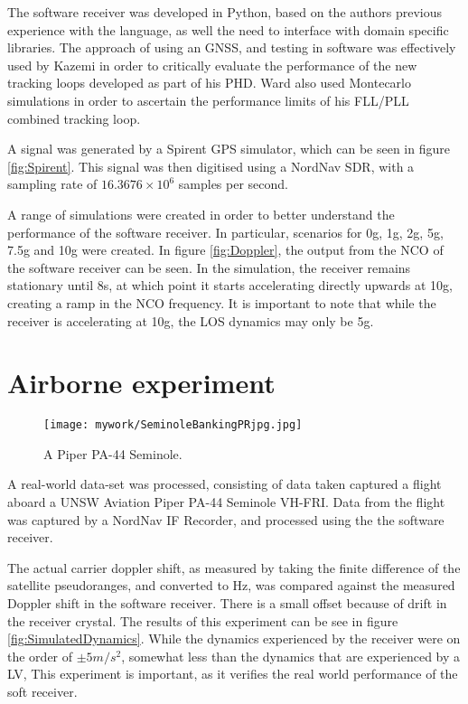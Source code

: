 The software receiver was developed in Python, based on the authors previous experience with the language, as well the need to interface with domain specific libraries.  The approach of using an \ac{GNSS}, and testing in software was effectively used by Kazemi \cite{KazemiPHD} in order to critically evaluate the performance of the new tracking loops developed as part of his PHD. Ward also used Montecarlo simulations in order to ascertain the performance limits of his FLL/PLL combined tracking loop.

A signal was generated by a Spirent \ac{GPS} simulator, which can be seen in figure \ref{fig:Spirent}. This signal was then digitised using a NordNav \ac{SDR}, with a sampling rate of $16.3676 \times 10^6$ samples per second. 

A range of simulations were created in order to better understand the performance of the software receiver. In particular, scenarios for 0g, 1g, 2g, 5g, 7.5g and 10g were created. In figure \ref{fig:Doppler}, the output from the \ac{NCO} of the software receiver can be seen. In the simulation, the receiver remains stationary until 8s, at which point it starts accelerating directly upwards at 10g, creating a ramp in the \ac{NCO} frequency. It is important to note that while the receiver is accelerating at 10g, the \ac{LOS} dynamics may only be 5g. 


\section{Airborne experiment}

\begin{figure}[!htb] 
    \centering
    \texttt{[image: mywork/SeminoleBankingPRjpg.jpg]} 
    \caption{A Piper PA-44 Seminole.}
    \label{fig:PiperSeminole}
\end{figure}

A real-world data-set was processed, consisting of data taken captured a flight aboard a UNSW Aviation Piper PA-44 Seminole VH-FRI. Data from the flight was captured by a NordNav IF Recorder, and processed using the the software receiver. 

The actual carrier doppler shift, as measured by taking the finite difference of the satellite pseudoranges, and converted to Hz, was compared against the measured Doppler shift in the software receiver. There is a small offset because of drift in the receiver crystal. The results of this experiment can be see in figure \ref{fig:SimulatedDynamics}. While the dynamics experienced by the receiver were on the order of $\pm 5m/s^2$, somewhat less than the dynamics that are experienced by a \ac{LV}, This experiment is important, as it verifies the real world performance of the soft receiver. 


